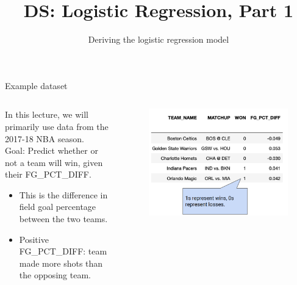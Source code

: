 \documentclass[aspectratio=169]{../latex_main/tntbeamer}  %
\title[Introduction]{DS: Logistic Regression, Part 1}
\subtitle{Deriving the logistic regression model}
\begin{document}
	
	\maketitle
	\begin{frame}{Example dataset}
	    \begin{columns}
	        \begin{column}{.4\textwidth}
	                In this lecture, we will primarily use data from the 2017-18 NBA season.\\  \bigskip
	                Goal: Predict whether or not a team will win, given their FG\_PCT\_DIFF.
	                \begin{itemize}
	                    \item This is the difference in field goal percentage between the two teams.
	                    \item Positive FG\_PCT\_DIFF: team made more shots than the opposing team.
	                \end{itemize}
	        \end{column}
	        
	        \begin{column}{.4\textwidth}
	                \begin{figure}
	                    \includegraphics[scale=.35]{Bild3}
	                \end{figure}
	        \end{column}
	    \end{columns}
	\end{frame}
	
\end{document}
